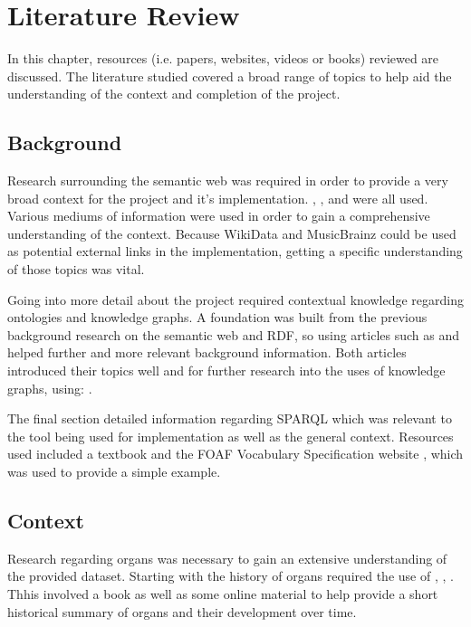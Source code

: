 \chapter{Literature Review}
In this chapter, resources (i.e. papers, websites, videos or books) reviewed are discussed. The literature studied covered a broad range of topics to help aid the understanding of the context and completion of the project.

\section{Background}
\hspace{0.5cm} Research surrounding the semantic web was required in order to provide a very broad context for the project and it's implementation. \cite{berners-TBLBook}, \cite{semanticweb}, \cite{rdf} and \cite{TTL} were all used. Various mediums of information were used in order to gain a comprehensive understanding of the context. Because WikiData \cite{wikidata} and MusicBrainz \cite{musicbrainz} could be used as potential external links in the implementation, getting a specific understanding of those topics was vital. 

Going into more detail about the project required contextual knowledge regarding ontologies and knowledge graphs. A foundation was built from the previous background research on the semantic web and RDF, so using articles such as \cite{ontology} and \cite{knowledgegraph} helped further and more relevant background information. Both articles introduced their topics well and for further research into the uses of knowledge graphs, using: \cite{searchengine}.   

The final section detailed information regarding SPARQL which was relevant to the tool being used for implementation as well as the general context. Resources used included a textbook\cite{sparlbook} and the FOAF Vocabulary Specification website \cite{foaf}, which was used to provide a simple example. 

\section{Context}
\hspace{0.5cm} Research regarding organs was necessary to gain an extensive understanding of the provided dataset. Starting with the history of organs required the use of \cite{organhistory}, \cite{organhistory1}, \cite{organmedivalhistory}. Thhis involved a book as well as some online material to help provide a short historical summary of organs and their development over time. 

